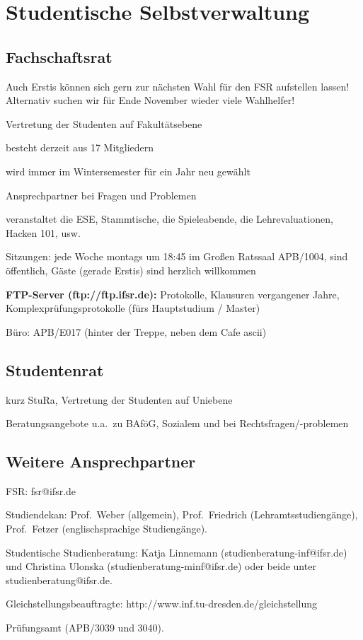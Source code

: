 \documentclass[a4paper,12pt]{report}
\begin{document}
\section{Studentische Selbstverwaltung}

\subsection{Fachschaftsrat}
\begin{itemize*}
    \item Auch Erstis können sich gern zur nächsten Wahl für den FSR aufstellen lassen! Alternativ suchen wir für Ende November wieder viele Wahlhelfer!
    \item Vertretung der Studenten auf Fakultätsebene
    \item besteht derzeit aus 17 Mitgliedern
    \item wird immer im Wintersemester für ein Jahr neu gewählt
    \item Ansprechpartner bei Fragen und Problemen
    \item veranstaltet die ESE, Stammtische, die Spieleabende, die Lehrevaluationen, Hacken 101, usw.
    \item Sitzungen: jede Woche montags um 18:45 im Großen Ratssaal APB/1004, sind öffentlich, Gäste (gerade Erstis) sind herzlich willkommen
    \item \textbf{FTP-Server (ftp://ftp.ifsr.de):} Protokolle, Klausuren vergangener Jahre, Komplexprüfungsprotokolle (fürs Hauptstudium / Master)
    \item Büro: APB/E017 (hinter der Treppe, neben dem Cafe ascii)
\end{itemize*}

\subsection{Studentenrat}
\begin{itemize*}
    \item kurz StuRa, Vertretung der Studenten auf Uniebene
    \item Beratungsangebote u.a.\ zu BAföG, Sozialem und bei Rechtsfragen/-problemen
\end{itemize*}

\subsection{Weitere Ansprechpartner}
\begin{itemize*}
    \item FSR\@: fsr@ifsr.de
    \item Studiendekan: Prof.\ Weber (allgemein), Prof.\ Friedrich (Lehramtsstudiengänge), Prof.\ Fetzer (englischsprachige Studiengänge).
    \item Studentische Studienberatung: Katja Linnemann (studienberatung-inf@ifsr.de) und Christina Ulonska (studienberatung-minf@ifsr.de) oder beide unter studienberatung@ifsr.de.
    \item Gleichstellungsbeauftragte: http://www.inf.tu-dresden.de/gleichstellung
    \item Prüfungsamt (APB/3039 und 3040).
\end{itemize*}
\end{document}
